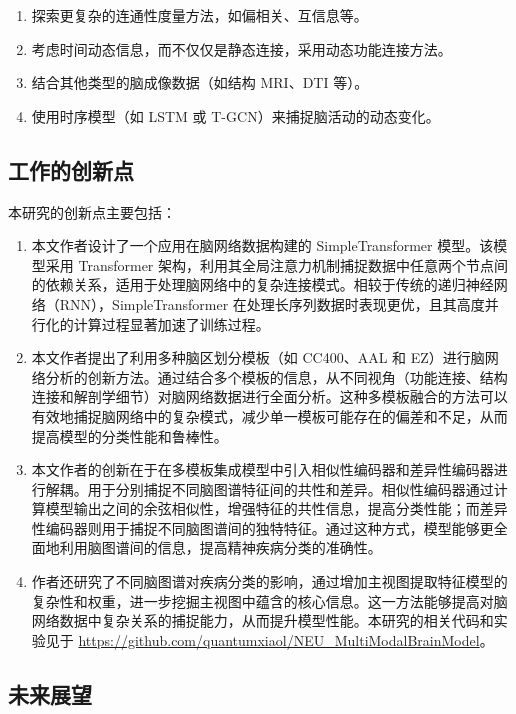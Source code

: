 \documentclass[12pt,a4paper]{article}
\begin{document}
\begin{enumerate}
\item 探索更复杂的连通性度量方法，如偏相关、互信息等。
\item 考虑时间动态信息，而不仅仅是静态连接，采用动态功能连接方法。
\item 结合其他类型的脑成像数据（如结构 MRI、DTI 等）。
\item 使用时序模型（如 LSTM 或 T-GCN）来捕捉脑活动的动态变化。
\end{enumerate}

\subsection{工作的创新点}

本研究的创新点主要包括：

\begin{enumerate}
\item 本文作者设计了一个应用在脑网络数据构建的 SimpleTransformer 模型。该模型采用 Transformer 架构，利用其全局注意力机制捕捉数据中任意两个节点间的依赖关系，适用于处理脑网络中的复杂连接模式。相较于传统的递归神经网络（RNN），SimpleTransformer 在处理长序列数据时表现更优，且其高度并行化的计算过程显著加速了训练过程。

\item 本文作者提出了利用多种脑区划分模板（如 CC400、AAL 和 EZ）进行脑网络分析的创新方法。通过结合多个模板的信息，从不同视角（功能连接、结构连接和解剖学细节）对脑网络数据进行全面分析。这种多模板融合的方法可以有效地捕捉脑网络中的复杂模式，减少单一模板可能存在的偏差和不足，从而提高模型的分类性能和鲁棒性。

\item 本文作者的创新在于在多模板集成模型中引入相似性编码器和差异性编码器进行解耦。用于分别捕捉不同脑图谱特征间的共性和差异。相似性编码器通过计算模型输出之间的余弦相似性，增强特征的共性信息，提高分类性能；而差异性编码器则用于捕捉不同脑图谱间的独特特征。通过这种方式，模型能够更全面地利用脑图谱间的信息，提高精神疾病分类的准确性。

\item 作者还研究了不同脑图谱对疾病分类的影响，通过增加主视图提取特征模型的复杂性和权重，进一步挖掘主视图中蕴含的核心信息。这一方法能够提高对脑网络数据中复杂关系的捕捉能力，从而提升模型性能。本研究的相关代码和实验见于 \url{https://github.com/quantumxiaol/NEU_MultiModalBrainModel}。
\end{enumerate}

\subsection{未来展望}
\end{document}
